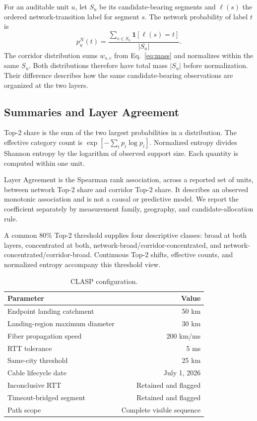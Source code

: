 For an auditable unit $u$, let $S_u$ be its candidate-bearing segments and
$\ell(s)$ the ordered network-transition label for segment $s$. The network
probability of label $t$ is
\begin{equation}
  p_u^N(t)=
  \frac{\sum_{s\in S_u}\mathbf{1}[\ell(s)=t]}{|S_u|}.
  \label{eq:network-distribution}
\end{equation}
The corridor distribution sums $w_{s,c}$ from Eq.~\eqref{eq:mass} and
normalizes within the same $S_u$. Both distributions therefore have total
mass $|S_u|$ before normalization. Their difference describes how the same
candidate-bearing observations are organized at the two layers.

\subsection{Summaries and Layer Agreement}
\label{sec:framework_metrics}

Top-2 share is the sum of the two largest probabilities in a distribution.
The effective category count is
$\exp[-\sum_i p_i\log p_i]$. Normalized entropy divides Shannon entropy by
the logarithm of observed support size. Each quantity is computed within one
unit.

Layer Agreement is the Spearman rank association, across a reported set of
units, between network Top-2 share and corridor Top-2 share. It describes an
observed monotonic association and is not a causal or predictive model. We
report the coefficient separately by measurement family, geography, and
candidate-allocation rule.

A common 80\% Top-2 threshold supplies four descriptive classes: broad at both
layers, concentrated at both, network-broad/corridor-concentrated, and
network-concentrated/corridor-broad. Continuous Top-2 shifts, effective counts,
and normalized entropy accompany this threshold view.

\begin{table}[t]
  \centering
  \caption{CLASP configuration.}
  \label{tab:measurement-configuration}
  \footnotesize
  \setlength{\tabcolsep}{3.5pt}
  \begin{tabular}{lr}
    \toprule
    Parameter & Value \\
    \midrule
    Endpoint landing catchment & 50 km \\
    Landing-region maximum diameter & 30 km \\
    Fiber propagation speed & 200 km/ms \\
    RTT tolerance & 5 ms \\
    Same-city threshold & 25 km \\
    Cable lifecycle date & July 1, 2026 \\
    Inconclusive RTT & Retained and flagged \\
    Timeout-bridged segment & Retained and flagged \\
    Path scope & Complete visible sequence \\
    \bottomrule
  \end{tabular}
\end{table}
